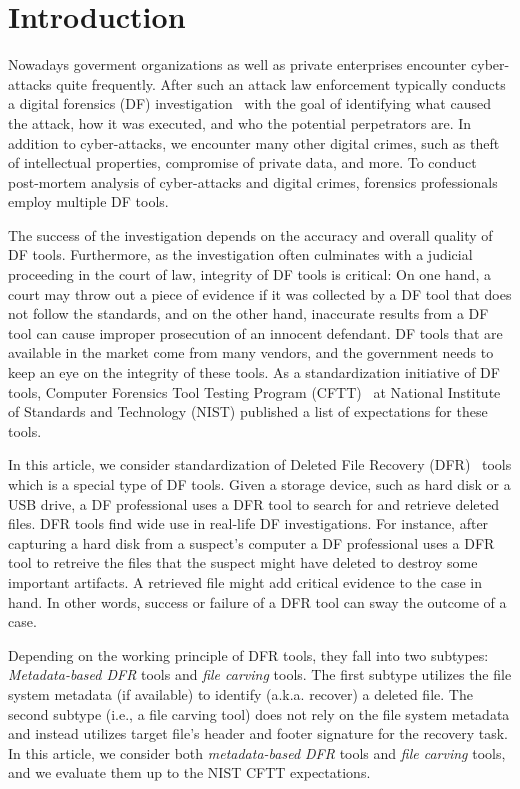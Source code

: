 \section{Introduction}\label{intro}

Nowadays goverment organizations as well as private enterprises encounter cyber-attacks quite frequently.
After such an attack law enforcement typically conducts a digital forensics (DF) investigation~\cite{df:news} \morecite 
with the goal of identifying what caused the attack, how it was executed, and who the potential perpetrators are. 
In addition to cyber-attacks, we encounter many other digital crimes, such as theft of intellectual properties, 
compromise of private data, and more. To conduct post-mortem analysis of cyber-attacks and digital crimes, forensics professionals
employ multiple DF tools. 

The success of the investigation depends on the accuracy and overall quality of DF tools.
Furthermore, as the investigation often culminates with a judicial proceeding in the court of law, integrity of DF tools 
is critical: On one hand, a court may throw out a piece of evidence if it was collected by a DF tool that does not follow the standards, 
and on the other hand, inaccurate results from a DF tool can cause improper prosecution of an innocent defendant. 
DF tools that are available in the market come from many vendors, and the government needs to keep an eye on the integrity of these tools. 
As a standardization initiative of DF tools,  Computer Forensics Tool Testing Program (CFTT)~\cite{cftt:nist} 
at National Institute of Standards and Technology (NIST) published a list of expectations for these tools. 

In this article, we consider standardization of Deleted File Recovery (DFR)~\cite{meta:dfr:standards} \morecite tools which is a special type of DF tools. 
Given a storage device, such as hard disk or a USB drive, a DF professional uses a DFR tool to search for and retrieve deleted files.
DFR tools find wide use in real-life DF investigations. For instance, after capturing a hard disk from a suspect's computer a
DF professional uses a DFR tool to retreive the files that the suspect might have deleted to destroy some important artifacts.
A retrieved file might add critical evidence to the case in hand. In other words, success or failure of a DFR tool can sway the outcome of a case.

Depending on the working principle of DFR tools, they fall into two subtypes: \emph{Metadata-based DFR} tools and \emph{file carving} tools.
The first subtype utilizes the file system metadata (if available) to identify (a.k.a. recover) a deleted file. 
The second subtype (i.e., a file carving tool) does not rely on the file system metadata and instead utilizes target file's 
header and footer signature for the recovery task. 
In this article, we consider both \emph{metadata-based DFR} tools and \emph{file carving} tools, and we evaluate them up to the NIST CFTT expectations.       

